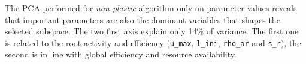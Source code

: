 
\begin{figure}%
    \classiccaptionstyle
{}
\end{figure}

The PCA performed for \textit{non plastic} algorithm only on parameter values reveals that important parameters are also the dominant variables that shapes the selected subspace. The two first axis explain only 14\% of variance. The first one is related to the root activity and efficiency (\texttt{u\_max}, \texttt{l\_ini}, \texttt{rho\_ar} and \texttt{s\_r}), the second is in line with global efficiency and resource availability.

